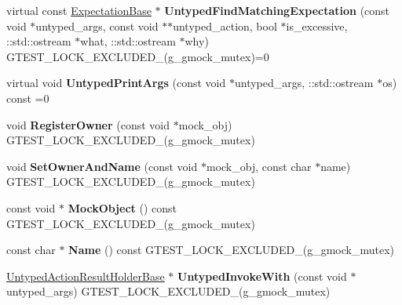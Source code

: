 \begin{DoxyCompactItemize}
\item 
\mbox{\label{classtesting_1_1internal_1_1_untyped_function_mocker_base_a38714b44836c937fe95524f8d7063d04}} 
virtual const \mbox{\hyperlink{classtesting_1_1internal_1_1_expectation_base}{Expectation\+Base}} $\ast$ {\bfseries Untyped\+Find\+Matching\+Expectation} (const void $\ast$untyped\+\_\+args, const void $\ast$$\ast$untyped\+\_\+action, bool $\ast$is\+\_\+excessive, \+::std\+::ostream $\ast$what, \+::std\+::ostream $\ast$why) G\+T\+E\+S\+T\+\_\+\+L\+O\+C\+K\+\_\+\+E\+X\+C\+L\+U\+D\+E\+D\+\_\+(g\+\_\+gmock\+\_\+mutex)=0
\item 
\mbox{\label{classtesting_1_1internal_1_1_untyped_function_mocker_base_ae8c91f05fc90e66a84df49aae8de0d41}} 
virtual void {\bfseries Untyped\+Print\+Args} (const void $\ast$untyped\+\_\+args, \+::std\+::ostream $\ast$os) const =0
\item 
\mbox{\label{classtesting_1_1internal_1_1_untyped_function_mocker_base_a0cd3dd14b92c714eab690c9597f32ffd}} 
void {\bfseries Register\+Owner} (const void $\ast$mock\+\_\+obj) G\+T\+E\+S\+T\+\_\+\+L\+O\+C\+K\+\_\+\+E\+X\+C\+L\+U\+D\+E\+D\+\_\+(g\+\_\+gmock\+\_\+mutex)
\item 
\mbox{\label{classtesting_1_1internal_1_1_untyped_function_mocker_base_a287bcacee639b7d123cec29e0614fe96}} 
void {\bfseries Set\+Owner\+And\+Name} (const void $\ast$mock\+\_\+obj, const char $\ast$name) G\+T\+E\+S\+T\+\_\+\+L\+O\+C\+K\+\_\+\+E\+X\+C\+L\+U\+D\+E\+D\+\_\+(g\+\_\+gmock\+\_\+mutex)
\item 
\mbox{\label{classtesting_1_1internal_1_1_untyped_function_mocker_base_a71863dd67193a7082078d5b366d5ce51}} 
const void $\ast$ {\bfseries Mock\+Object} () const G\+T\+E\+S\+T\+\_\+\+L\+O\+C\+K\+\_\+\+E\+X\+C\+L\+U\+D\+E\+D\+\_\+(g\+\_\+gmock\+\_\+mutex)
\item 
\mbox{\label{classtesting_1_1internal_1_1_untyped_function_mocker_base_ae90a5b5d48db1e99634bc6ff39ded335}} 
const char $\ast$ {\bfseries Name} () const G\+T\+E\+S\+T\+\_\+\+L\+O\+C\+K\+\_\+\+E\+X\+C\+L\+U\+D\+E\+D\+\_\+(g\+\_\+gmock\+\_\+mutex)
\item 
\mbox{\label{classtesting_1_1internal_1_1_untyped_function_mocker_base_adaec41c0ba8a07c2415f6c8efa0ca54f}} 
\mbox{\hyperlink{classtesting_1_1internal_1_1_untyped_action_result_holder_base}{Untyped\+Action\+Result\+Holder\+Base}} $\ast$ {\bfseries Untyped\+Invoke\+With} (const void $\ast$untyped\+\_\+args) G\+T\+E\+S\+T\+\_\+\+L\+O\+C\+K\+\_\+\+E\+X\+C\+L\+U\+D\+E\+D\+\_\+(g\+\_\+gmock\+\_\+mutex)
\end{DoxyCompactItemize}
